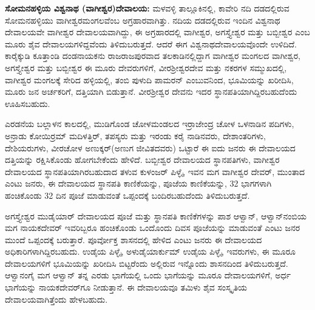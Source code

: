 \textbf{ಸೋಮನಹಳ್ಳಿಯ ವಿಶ್ವನಾಥ (ವಾಗೀಶ್ವರ)ದೇವಾಲಯ:} ಮಳವಳ್ಳಿ ತಾಲ್ಲೂಕಿನಲ್ಲಿ, ಕಾವೇರಿ ನದಿ ದಡದಲ್ಲಿರುವ ಸೋಮನಹಳ್ಳಿಯು ವಾಗೀಶ್ವರಮಂಗಲವೆಂಬ ಅಗ್ರಹಾರವಾಗಿತ್ತು. ನದಿಯ ದಡದಲ್ಲಿರುವ ಇಂದಿನ ವಿಶ್ವನಾಥ ದೇವಾಲಯವೇ ವಾಗೀಶ್ವರ ದೇವಾಲಯವಾಗಿದ್ದು, ಈ ಅಗ್ರಹಾರದಲ್ಲಿ ವಾಗೀಶ್ವರ, ಅಗಸ್ತ್ಯೇಶ್ವರ ಮತ್ತು ಬಬ್ಬೀಶ್ವರ ಎಂಬ ಮೂರು ಶೈವ ದೇವಾಲಯಗಳಿದ್ದವೆಂದು ತಿಳಿದುಬರುತ್ತದೆ. ಆದರೆ ಈಗ ವಿಶ್ವನಾಥದೇವಾಲಯವೊಂದೇ ಉಳಿದಿದೆ. ಕಾರೈಕ್ಕುಡಿ ಕೂತ್ತಾಂಡಿ ದಂಡನಾಯಕನು ರಾಜರಾಜಪುರವಾದ ತಲಕಾಡಿನಲ್ಲಿದ್ದಾಗ ವಾಗೀಶ್ವರ ಮಂಗಲದ ವಾಗೀಶ್ವರ, ಅಗಸ್ತ್ಯೇಶ್ವರ ಮತ್ತು ಬಬ್ಬೀಶ್ವರ ಈ ಮೂರು ದೇವರುಗಳಿಗೆ, ವೀರಶ‍್ರೀಶ್ವರದೇವ ಮತ್ತು ನಕರಗಳ ಸಮ್ಮುಖದಲ್ಲಿ, ವಾಗೀಶ್ವರ ಮಂಗಲಕ್ಕೆ ಸೇರಿದ ಹಳ್ಳಿಯಲ್ಲಿ, ತಂಬಿ ಪುಳುದಿ ಪಾಮರನ್​ ಎಂಬುವನಿಂದ, ಭೂಮಿಯನ್ನು ಖರೀದಿಸಿ, ಮೂರು ಜನ ಅರ್ಚಕರಿಗೆ, ದತ್ತಿಯಾಗಿ ಬಿಡುತ್ತಾನೆ. ವೀರಶ‍್ರೀಶ್ವರ ದೇವನು ಇದರ ಸ್ಥಾನಪತಿಯಾಗಿದ್ದಿರಬಹುದೆಂದು ಊಹಿಸಬಹುದು.

ಎರಡನೆಯ ಬಲ್ಲಾಳನ ಕಾಲದಲ್ಲಿ, ಮುಡಿಗೊಂಡ ಚೋಳಮಂಡಲದ ಇರ್ರಾಜೇಂದ್ರ ಚೋಳ ಒಳನಾಡಿನ ಪದಿಗಳು, ಅನ್ರಾಡು ಕೋಯಿರ್ರಮ್ ಮದಿಳತ್ತಿರ್​, ತಪಸ್ಯರು ಮತ್ತು ಇರಂಡು ಕರೈ ನಾಡಿನವರು, ದೇಶಾಂತರಿಗಳು, ದೇಶಿಯರುಗಳು, ವೀರಚೋಳ ಅಣುಕ್ಕರ್​(ಅಣುಗ ಜೀವಿತದವರು) ಒಟ್ಟಾರೆ ಈ ಐದು ಜನರು ಈ ದೇವಾಲಯದ ದತ್ತಿಯನ್ನು ರಕ್ಷಿಸಿಕೊಂಡು ಹೋಗಬೇಕೆಂದು ಹೇಳಿದೆ. ಬಬ್ಬೀಶ್ವರ ದೇವಾಲಯದ ಸ್ಥಾನಪತಿಗಳು, ವಾಗೀಶ್ವರ ದೇವಾಲಯದ ಸ್ಥಾನಪತಿಯಾಗಿರಬಹುದಾದ ತಳುವ ಕುಳಂಜರ್​ ಪಿಳ್ಳೈ, ಇವನ ಮಗ ವಾಗೀಶ್ವರ ದೇವರ್​, ಮುಂತಾದ ಎಂಟು ಜನರು, ಈ ದೇವಾಲಯದ ಸ್ಥಾನಪತಿ ಕಾಣಿಕೆಯನ್ನು, ಪೂಜೆಯ ಕಾಣಿಕೆಯನ್ನು, 32 ಭಾಗಗಳಾಗಿ ಹಂಚಿಕೊಂಡು 32 ದಿನ ಪೂಜೆ ಮಾಡುವಂತೆ ಒಪ್ಪಂದಕ್ಕೆ ಬಂದಿರಬಹುದೆಂದು ತಿಳಿದುಬರುತ್ತದೆ.

ಅಗಸ್ತ್ಯೇಶ್ವರ ಮುಡೈಯಾರ್​ ದೇವಾಲಯದ ಪೂಜೆ ಮತ್ತು ಸ್ಥಾನಪತಿ ಕಾಣಿಕೆಗಳನ್ನು ಪಾಶ ಆಳ್ವಾನ್​, ಆಳ್ವಾನ್​ ನಂಬಿಯ ಮಗ ನಾಯಕದೇವರ್​ ಇವರಿಬ್ಬರೂ ಹಂಚಿಕೊಂಡು ಒಂದೊಂದು ದಿವಸ ಪೂಜೆಯನ್ನು ಮಾಡುವಂತೆ ಎಂಟು ಜನರ ಮುಂದೆ ಒಪ್ಪಂದಕ್ಕೆ ಬರುತ್ತಾರೆ. ಪೂರ್ವೋಕ್ತ ಶಾಸನದಲ್ಲಿ ಹೇಳಿದ ಎಂಟು ಜನರು ಈ ದೇವಾಲಯದ ಅಧಿಕಾರಿಗಳಾಗಿದ್ದಿರಬಹುದು. ಉಡೈಯ ಪಿಳ್ಳೈ, ಅಳುಡೈಯಾರ್ಕುಮ್ ಉಡೈಯ ಪಿಳ್ಳೈ, ಇವರುಗಳು, ಈ ಮೂರೂ ದೇವಾಲಯಗಳಿಗೆ ಭೂಮಿಯನ್ನು ಖರೀದಿಸಿ ಬಿಟ್ಟರೆಂದು ಅಲ್ಲಿರುವ ಇನ್ನೊಂದು ಶಾಸನದಿಂದ ತಿಳಿದುಬರುತ್ತದೆ. ಆಳ್ವಾನಂಗೈ ಮಗ ಆಳ್ವಾನ್​ ತನ್ನ ಎರಡು ಭಾಗೆಯಲ್ಲಿ ಒಂದು ಭಾಗೆಯನ್ನು ಮೂರೂ ದೇವಾಲಯಗಳಿಗೆ, ಅರ್ಧ ಭಾಗೆಯನ್ನು ನಾಯಕದೇವರ್​ಗೂ ನೀಡುತ್ತಾನೆ. ಈ ದೇವಾಲಯವೂ ತಮಿಳು ಶೈವ ಸಂಸ್ಕೃತಿಯ ದೇವಾಲಯವಾಗಿತ್ತೆಂದು ಹೇಳಬಹುದು.

